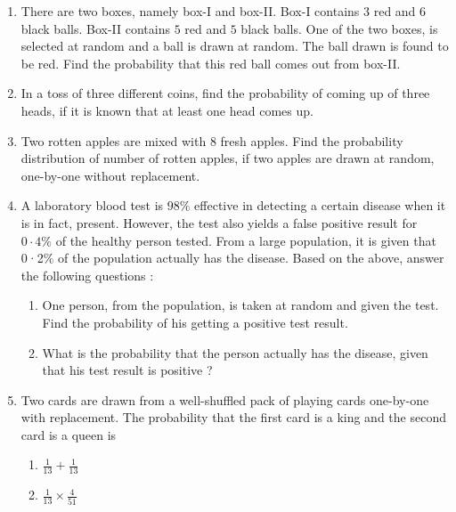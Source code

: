 \begin{enumerate}
\begin{enumerate}[label=(\alph*)]
\end{enumerate}

 \item There are two boxes, namely box-I and box-II. Box-I contains $3$ red and $6$ black balls. Box-II contains $5$ red and $5$ black balls. One of the two boxes, is selected at random and a ball is drawn at random. The ball drawn is found to be red. Find the probability that this red ball comes out from box-II.

\item In a toss of three different coins, find the probability of coming up of three heads, if it is known that at least one head comes up.

\item Two rotten apples are mixed with $8$ fresh apples. Find the probability distribution of number of rotten apples, if two apples are drawn at random, one-by-one without replacement.

\item A laboratory blood test is $98\%$ effective in detecting a certain 
disease when it is in fact, present. However, the test also yields 
a false positive result for $0·4\%$ of the healthy person tested. 
From a large population, it is given that 0·2$\%$ of the population 
actually has the disease. 
Based on the above, answer the following questions : 

  \begin{enumerate}[label=(\alph*)]
    
 \item One person, from the population, is taken at random and 
given the test. Find the probability of his getting a 
positive test result.  
 
 \item  What is the probability that the person actually has the 
disease, given that his test result is positive ?

\end{enumerate}

\item Two cards are drawn from a well-shuffled pack of playing 
cards one-by-one with replacement. The probability that the 
first card is a king and the second card is a queen is 

\begin{enumerate}[label=(\alph*)]
    
 \item $\frac{1}{13} + \frac{1}{13}$
 
 \item $\frac{1}{13} \times \frac{4}{51}$


\end{enumerate}
\end{enumerate}
